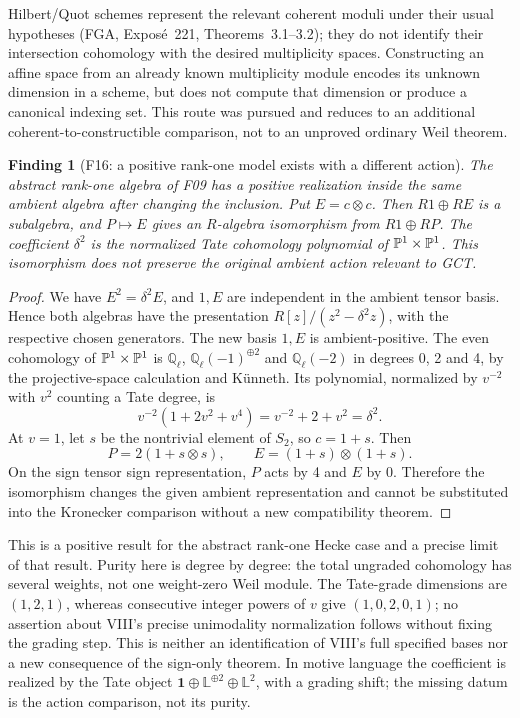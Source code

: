 \documentclass[11pt,a4paper]{article}
\newcommand{\Q}{\mathbb Q}\newcommand{\Z}{\mathbb Z}\newcommand{\C}{\mathbb C}\newcommand{\N}{\mathbb N}\newcommand{\F}{\mathbb F}
\newcommand{\fid}[1]{\textsf{#1}}\newcommand{\gate}[1]{\textsf{#1}}
\theoremstyle{named}\newtheorem{finding}{Finding}[section]
\theoremstyle{definition}\newtheorem{definition}[finding]{Definition}
\theoremstyle{remark}\newtheorem{remark}[finding]{Remark}
\begin{document}
Hilbert/Quot schemes represent the relevant coherent moduli under their usual hypotheses (FGA, Expos\'e~221, Theorems~3.1--3.2); they do not identify their intersection cohomology with the desired multiplicity spaces. Constructing an affine space from an already known multiplicity module encodes its unknown dimension in a scheme, but does not compute that dimension or produce a canonical indexing set. This route was pursued and reduces to an additional coherent-to-constructible comparison, not to an unproved ordinary Weil theorem.

\begin{finding}[\fid{F16}: a positive rank-one model exists with a different action]\label{f:rankonemodel}
The abstract rank-one algebra of \fid{F09} has a positive realization inside the same ambient algebra after changing the inclusion. Put $E=c\otimes c$. Then $R1\oplus RE$ is a subalgebra, and $P\mapsto E$ gives an $R$-algebra isomorphism from $R1\oplus RP$. The coefficient $\delta^2$ is the normalized Tate cohomology polynomial of $\mathbb P^1\times\mathbb P^1$. This isomorphism does not preserve the original ambient action relevant to GCT.
\end{finding}
\begin{proof}
We have $E^2=\delta^2E$, and $1,E$ are independent in the ambient tensor basis. Hence both algebras have the presentation $R[z]/(z^2-\delta^2z)$, with the respective chosen generators. The new basis $1,E$ is ambient-positive. The even cohomology of $\mathbb P^1\times\mathbb P^1$ is $\Q_\ell$, $\Q_\ell(-1)^{\oplus2}$ and $\Q_\ell(-2)$ in degrees 0, 2 and 4, by the projective-space calculation and K\"unneth. Its polynomial, normalized by $v^{-2}$ with $v^2$ counting a Tate degree, is
\[
 v^{-2}(1+2v^2+v^4)=v^{-2}+2+v^2=\delta^2.
\]
At $v=1$, let $s$ be the nontrivial element of $S_2$, so $c=1+s$. Then
\[
 P=2(1+s\otimes s),\qquad E=(1+s)\otimes(1+s).
\]
On the sign tensor sign representation, $P$ acts by 4 and $E$ by 0. Therefore the isomorphism changes the given ambient representation and cannot be substituted into the Kronecker comparison without a new compatibility theorem.
\end{proof}
This is a positive result for the abstract rank-one Hecke case and a precise limit of that result. Purity here is degree by degree: the total ungraded cohomology has several weights, not one weight-zero Weil module. The Tate-grade dimensions are $(1,2,1)$, whereas consecutive integer powers of $v$ give $(1,0,2,0,1)$; no assertion about VIII's precise unimodality normalization follows without fixing the grading step. This is neither an identification of VIII's full specified bases nor a new consequence of the sign-only theorem. In motive language the coefficient is realized by the Tate object $\mathbf1\oplus\mathbb L^{\oplus2}\oplus\mathbb L^2$, with a grading shift; the missing datum is the action comparison, not its purity.
\end{document}
